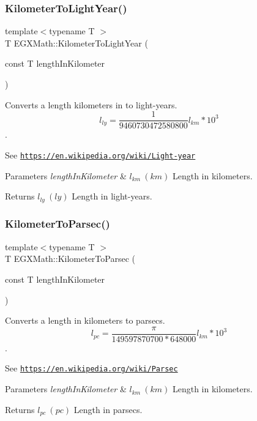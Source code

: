 \subsubsection{\texorpdfstring{Kilometer\+To\+Light\+Year()}{KilometerToLightYear()}}
{\footnotesize\ttfamily template$<$typename T $>$ \\
T E\+G\+X\+Math\+::\+Kilometer\+To\+Light\+Year (\begin{DoxyParamCaption}\item[{const T}]{length\+In\+Kilometer }\end{DoxyParamCaption})}



Converts a length kilometers in to light-\/years. \[ l_{ly}= \frac{1}{9460730472580800} l_{km} * 10^{3} \]. 

See \href{https://en.wikipedia.org/wiki/Light-year}{\tt https\+://en.\+wikipedia.\+org/wiki/\+Light-\/year} 
\begin{DoxyParams}{Parameters}
{\em length\+In\+Kilometer} & $ l_{km}\ (km)$ Length in kilometers. \\
\hline
\end{DoxyParams}
\begin{DoxyReturn}{Returns}
$ l_{ly}\ (ly)$ Length in light-\/years. 
\end{DoxyReturn}
\mbox{\label{group___e_g_x_math-_conversions-_length_conversions-_kilometer-_astronomical_ga0d120dfc56490ce318348950abb25dd1}} 
\subsubsection{\texorpdfstring{Kilometer\+To\+Parsec()}{KilometerToParsec()}}
{\footnotesize\ttfamily template$<$typename T $>$ \\
T E\+G\+X\+Math\+::\+Kilometer\+To\+Parsec (\begin{DoxyParamCaption}\item[{const T}]{length\+In\+Kilometer }\end{DoxyParamCaption})}



Converts a length in kilometers to parsecs. \[ l_{pc}=\frac{\pi}{149597870700 * 648000} l_{km} * 10^{3} \]. 

See \href{https://en.wikipedia.org/wiki/Parsec}{\tt https\+://en.\+wikipedia.\+org/wiki/\+Parsec} 
\begin{DoxyParams}{Parameters}
{\em length\+In\+Kilometer} & $ l_{km}\ (km)$ Length in kilometers. \\
\hline
\end{DoxyParams}
\begin{DoxyReturn}{Returns}
$ l_{pc}\ (pc)$ Length in parsecs. 
\end{DoxyReturn}
